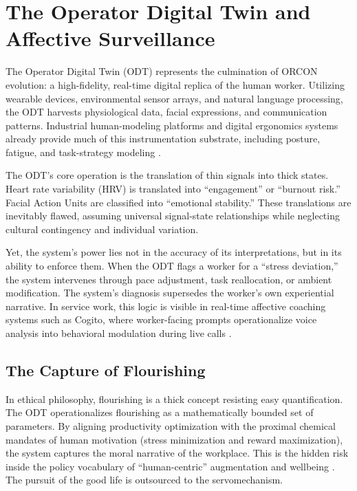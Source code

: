 \documentclass[11pt, a4paper]{article}
\begin{document}
\section{The Operator Digital Twin and Affective Surveillance}

The Operator Digital Twin (ODT) represents the culmination of ORCON evolution: a high-fidelity, real-time digital replica of the human worker. Utilizing wearable devices, environmental sensor arrays, and natural language processing, the ODT harvests physiological data, facial expressions, and communication patterns. Industrial human-modeling platforms and digital ergonomics systems already provide much of this instrumentation substrate, including posture, fatigue, and task-strategy modeling \cite{siemensPSXHuman,siemensHumanAdvanced}.

The ODT's core operation is the translation of thin signals into thick states. Heart rate variability (HRV) is translated into ``engagement'' or ``burnout risk.'' Facial Action Units are classified into ``emotional stability.'' These translations are inevitably flawed, assuming universal signal-state relationships while neglecting cultural contingency and individual variation. 

Yet, the system's power lies not in the accuracy of its interpretations, but in its ability to enforce them. When the ODT flags a worker for a ``stress deviation,'' the system intervenes through pace adjustment, task reallocation, or ambient modification. The system's diagnosis supersedes the worker's own experiential narrative. In service work, this logic is visible in real-time affective coaching systems such as Cogito, where worker-facing prompts operationalize voice analysis into behavioral modulation during live calls \cite{delagarza2019time,cogito2023businesswire}.

\subsection{The Capture of Flourishing}
In ethical philosophy, flourishing is a thick concept resisting easy quantification. The ODT operationalizes flourishing as a mathematically bounded set of parameters. By aligning productivity optimization with the proximal chemical mandates of human motivation (stress minimization and reward maximization), the system captures the moral narrative of the workplace. This is the hidden risk inside the policy vocabulary of ``human-centric'' augmentation and wellbeing \cite{breque2021industry}. The pursuit of the good life is outsourced to the servomechanism.
\end{document}

